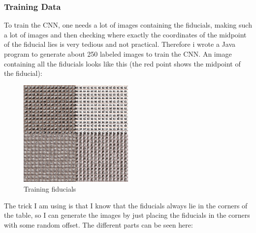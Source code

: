 \subsubsection{Training Data}\label{subsubsec:training-data}
To train the CNN, one needs a lot of images containing the fiducials, making such a lot of images and then checking where exactly the coordinates of the midpoint of the fiducial lies is very tedious and not practical.
Therefore i wrote a Java program to generate about 250 labeled images to train the CNN.
An image containing all the fiducials looks like this (the red point shows the midpoint of the fiducial):
\begin{figure}[H]
    \centering
    \includegraphics[width=0.5\textwidth]{../photos/training_whole_general_image}
    \caption[fiducials]{Training fiducials}
    \label{fig:fiducials}
\end{figure}
The trick I am using is that I know that the fiducials always lie in the corners of the table, so I can generate the images by just placing the fiducials in the corners with some random offset.
The different parts can be seen here:


